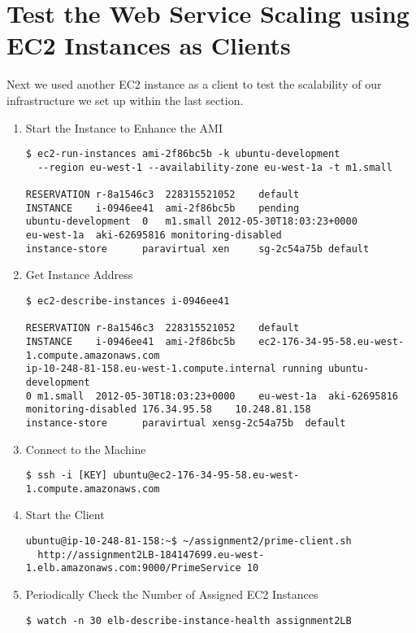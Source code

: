 \documentclass{article}
\begin{document}
\section{Test the Web Service Scaling using EC2 Instances as Clients}
Next we used another EC2 instance as a client to test the scalability of our infrastructure we set up within the last section.
\begin{enumerate}
	\item Start the Instance to Enhance the AMI
\begin{verbatim}
$ ec2-run-instances ami-2f86bc5b -k ubuntu-development 
  --region eu-west-1 --availability-zone eu-west-1a -t m1.small

RESERVATION	r-8a1546c3	228315521052	default
INSTANCE	i-0946ee41	ami-2f86bc5b	pending	
ubuntu-development	0	m1.small 2012-05-30T18:03:23+0000
eu-west-1a	aki-62695816 monitoring-disabled	
instance-store		paravirtual xen		sg-2c54a75b	default
\end{verbatim}

	\item Get Instance Address
\begin{verbatim}
$ ec2-describe-instances i-0946ee41

RESERVATION	r-8a1546c3	228315521052	default
INSTANCE	i-0946ee41	ami-2f86bc5b	ec2-176-34-95-58.eu-west-1.compute.amazonaws.com	
ip-10-248-81-158.eu-west-1.compute.internal	running	ubuntu-development	
0 m1.small	2012-05-30T18:03:23+0000	eu-west-1a	aki-62695816	
monitoring-disabled	176.34.95.58	10.248.81.158
instance-store		paravirtual	xensg-2c54a75b	default
\end{verbatim}

	\item Connect to the Machine
\begin{verbatim}
$ ssh -i [KEY] ubuntu@ec2-176-34-95-58.eu-west-1.compute.amazonaws.com
\end{verbatim}

	\item Start the Client
\begin{verbatim}
ubuntu@ip-10-248-81-158:~$ ~/assignment2/prime-client.sh 
  http://assignment2LB-184147699.eu-west-1.elb.amazonaws.com:9000/PrimeService 10
\end{verbatim}

	\item Periodically Check the Number of Assigned EC2 Instances
\begin{verbatim}
$ watch -n 30 elb-describe-instance-health assignment2LB


\end{verbatim}
\end{enumerate}
\end{document}
